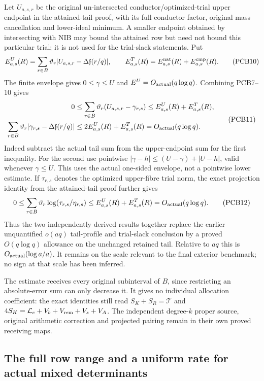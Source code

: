 Let $U_{a,s,r}$ be the original un-intersected conductor/optimized-trial
upper endpoint in the attained-tail proof, with its full conductor factor,
original mass cancellation and lower-ideal minimum. A smaller endpoint
obtained by intersecting with NIB may bound the attained row but need not
bound this particular trial; it is not used for the trial-slack statements.
Put
\[
 E^U_{a,s}(R)=\sum_{r\in B}\vartheta_r
       |U_{a,s,r}-\Delta\mathfrak f(r/q)|,
 \qquad E^T_{a,s}(R)=E^{\rm nat}_{a,s}(R)+E^{\rm cmp}_{a,s}(R).
 \tag{PCB10}
\]
The finite envelope gives $0\le\gamma\le U$ and
$E^U=O_{\rm actual}(q\log q)$. Combining PCB7--10 gives
\[
 \begin{split}
 0&\le\sum_{r\in B}\vartheta_r(U_{a,s,r}-\gamma_{r,s})
       \le E^U_{a,s}(R)+E^T_{a,s}(R),\\
 \sum_{r\in B}\vartheta_r
       |\gamma_{r,s}-\Delta\mathfrak f(r/q)|
       &\le2E^U_{a,s}(R)+E^T_{a,s}(R)
        =O_{\rm actual}(q\log q).
 \end{split}\tag{PCB11}
\]
Indeed subtract the actual tail sum from the upper-endpoint sum for the
first inequality. For the second use pointwise
$|\gamma-h|\le(U-\gamma)+|U-h|$, valid whenever $\gamma\le U$.
This uses the actual one-sided envelope, not a pointwise lower estimate.
If $\tau_{r,s}$ denotes the optimized upper-fibre trial norm, the exact
projection identity from the attained-tail proof further gives
\[
 0\le\sum_{r\in B}\vartheta_r\log(\tau_{r,s}/\eta_{r,s})
       \le E^U_{a,s}(R)+E^T_{a,s}(R)
       =O_{\rm actual}(q\log q).
 \tag{PCB12}
\]
Thus the two independently derived results together replace the earlier
unquantified $o(aq)$ tail-profile and trial-slack conclusion by a proved
$O(q\log q)$ allowance on the unchanged retained tail. Relative to $aq$
this is $O_{\rm actual}(\log a/a)$. It remains on the scale relevant to
the final exterior benchmark; no sign at that scale has been inferred.

The estimate receives every original subinterval of $B$, since restricting
an absolute-error sum can only decrease it. It gives no individual
allocation coefficient: the exact identities still read
$S_K+S_R=\mathcal T$ and
$4S_K=\mathcal L_e+V_b+V_{\rm rem}+V_s+V_A$.
The independent degree-$k$ proper source, original arithmetic correction
and projected pairing remain in their own proved receiving maps.

\subsection{The full row range and a uniform rate for actual mixed determinants}

